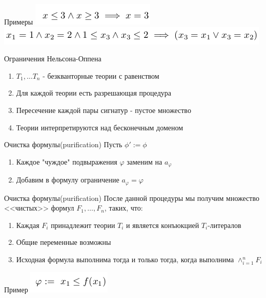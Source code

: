\documentclass{beamer}
\begin{document}
\begin{frame}{Примеры}
\includegraphics[scale=0.5]{convex.png}\newline
\includegraphics[scale=0.5]{not_convex.png}\newline
\end{frame}

\begin{frame}{Ограничения Нельсона-Оппена}
\begin{enumerate}
\item $T_1, \dots T_n$ - безкванторные теории с равенством
\item Для каждой теории есть разрешающая процедура
\item Пересечение каждой пары сигнатур - пустое множество
\item Теории интерпретируются над бесконечным доменом
\end{enumerate}
\end{frame}

\begin{frame}{Очистка формулы(purification)}
Пусть $\phi' := \phi$
\begin{enumerate}
\item Каждое "чуждое" подвыражения $\varphi$ заменим на $a_{\varphi}$
\item Добавим в формулу ограничение $a_{\varphi} = \varphi$
\end{enumerate}
\end{frame}

\begin{frame}{Очистка формулы(purification)}
После данной процедуры мы получим множество <<чистых>> формул $F_1, \dots, F_n$, таких, что:
\begin{enumerate}
\item Каждая $F_i$ принадлежит теории $T_i$ и является конъюкцией $T_i$-литералов
\item Общие переменные возможны
\item Исходная формула выполнима тогда и только тогда, когда выполнима $\wedge_{i=1}^{n}F_i$
\end{enumerate}
\end{frame}

\begin{frame}{Пример}
\includegraphics[scale=0.5]{ex1.png}\newline
\end{frame}
\end{document}
